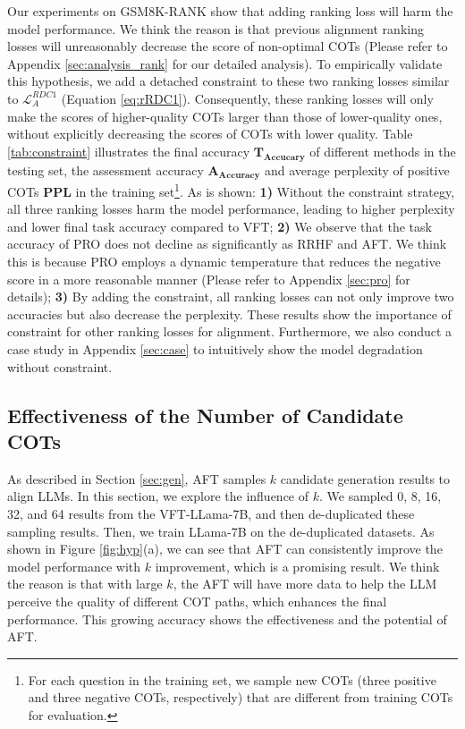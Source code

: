 \label{sec:other_rank}
Our experiments on GSM8K-RANK show that adding ranking loss will harm the model performance. We think the reason is that previous alignment ranking losses will unreasonably decrease the score of non-optimal COTs (Please refer to Appendix \ref{sec:analysis_rank} for our detailed analysis). To empirically validate this hypothesis, we add a detached constraint to these two ranking losses similar to $\mathcal{L}_A^{RDC1}$ (Equation \ref{eq:rRDC1}). 
Consequently, these ranking losses will only make the scores of higher-quality COTs larger than those of lower-quality ones, without explicitly decreasing the scores of COTs with lower quality. Table \ref{tab:constraint} illustrates the final accuracy $\mathbf{T_{Accucary}}$ of different methods in the testing set, the assessment accuracy
$\mathbf{A_{Accuracy}}$ and average perplexity of positive COTs $\mathbf{PPL}$ in the training set\footnote{For each question in the training set, we sample new COTs (three positive and three negative COTs, respectively) that are different from training COTs for evaluation.}. As is shown:
\textbf{1)} Without the constraint strategy, all three ranking losses harm the model performance, leading to higher perplexity  and lower final task accuracy  compared to VFT;
\textbf{2)} We observe that the task accuracy of PRO does not decline as significantly as RRHF and AFT. We think this is because PRO employs a dynamic temperature that reduces the negative score in a more reasonable manner (Please refer to Appendix \ref{sec:pro} for details);
\textbf{3)} By adding the constraint, all ranking losses can not only improve two accuracies but also decrease the perplexity. These results show the importance of constraint for other ranking losses for alignment. Furthermore, we also conduct a case study in Appendix \ref{sec:case} to intuitively show the model degradation without constraint.

\subsection{Effectiveness of the Number of Candidate COTs} 
\label{sec:num_k}
As described in Section \ref{sec:gen}, AFT samples $k$ candidate generation results to align LLMs. In this section, we explore the influence of $k$. We sampled 0, 8, 16, 32, and 64 results from the VFT-LLama-7B, and then de-duplicated these sampling results. Then, we train LLama-7B on the de-duplicated datasets. As shown in Figure \ref{fig:hyp}(a), we can see that AFT can consistently improve the model performance with $k$ improvement, which is a promising result. We think the reason is that with large $k$, the AFT will have more data to help the LLM perceive the quality of different COT paths, which enhances the final performance. This growing accuracy shows the effectiveness and the potential of AFT.

